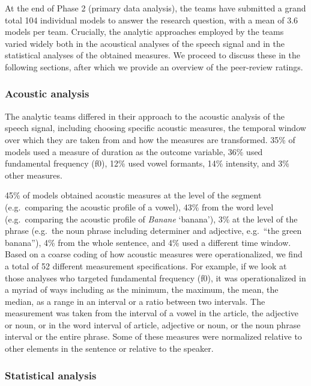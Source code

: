 \documentclass[Review,times,sageh]{sagej}
\begin{document}
At the end of Phase 2 (primary data analysis), the teams have submitted a grand total 104 individual models to answer the research question, with a mean of 3.6 models per team.
Crucially, the analytic approaches employed by the teams varied widely both in the acoustical analyses of the speech signal and in the statistical analyses of the obtained measures.
We proceed to discuss these in the following sections, after which we provide an overview of the peer-review ratings.

\hypertarget{acoustic-analysis}{%
\subsubsection{Acoustic analysis}\label{acoustic-analysis}}

The analytic teams differed in their approach to the acoustic analysis of the speech signal, including choosing specific acoustic measures, the temporal window over which they are taken from and how the measures are transformed.
35\% of models used a measure of duration as the outcome variable, 36\% used fundamental frequency (f0), 12\% used vowel formants, 14\% intensity, and 3\% other measures.

45\% of models obtained acoustic measures at the level of the segment (e.g.~comparing the acoustic profile of a vowel), 43\% from the word level (e.g.~comparing the acoustic profile of \emph{Banane} `banana'), 3\% at the level of the phrase (e.g.~the noun phrase including determiner and adjective, e.g.~``the green banana''), 4\% from the whole sentence, and 4\% used a different time window.
Based on a coarse coding of how acoustic measures were operationalized, we find a total of 52 different measurement specifications.
For example, if we look at those analyses who targeted fundamental frequency (f0), it was operationalized in a myriad of ways including as the minimum, the maximum, the mean, the median, as a range in an interval or a ratio between two intervals.
The measurement was taken from the interval of a vowel in the article, the adjective or noun, or in the word interval of article, adjective or noun, or the noun phrase interval or the entire phrase.
Some of these measures were normalized relative to other elements in the sentence or relative to the speaker.

\hypertarget{statistical-analysis}{%
\subsubsection{Statistical analysis}\label{statistical-analysis}}
\end{document}
